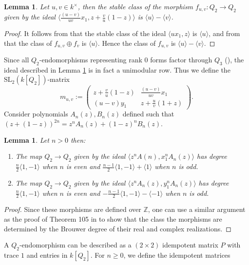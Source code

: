 \documentclass[11pt,leqno]{article}
\newcommand{\Z}{{\mathbb Z}}
\renewcommand{\1}{{\rm 1\hspace*{-0.4ex}%
\rule{0.1ex}{1.52ex}\hspace*{0.2ex}}}
\newcommand{\<}[1]{{\langle}#1 {\rangle}}
\theoremstyle{plain}
\newtheorem{lem}[thm]{Lemma}
\theoremstyle{definition}
\theoremstyle{remark}
\numberwithin{equation}{section}
\begin{document}
\begin{lem} 
\label{lem:q2rank0maps}
    Let $u,v \in k^\times$, then the stable class of the morphism $f_{u,v}\colon Q_2 \to Q_2 $ given by the ideal $\langle \frac{(u-v)}{uv}x_1,  z + \frac{v}{u}(1-z)\rangle$ is $\langle u\rangle - \langle v\rangle$. 
\end{lem}
\begin{proof}
     It follows from \cite[Proposition 103]{Barth25} that the stable class of the ideal $\langle ux_1,  z\rangle$ is $\langle u\rangle$, and from \cite[Lemma 91]{Barth25} that the class of $f_{u,v} \oplus f_v$ is $\langle u\rangle$. Hence the class of $f_{u,v}$ is $\langle u\rangle - \langle v\rangle $. 
\end{proof}
Since all $Q_2$-endomorphisms representing rank $0$ forms factor through $Q_3$ (\cite[Corollary 43]{Barth25}), the ideal described in Lemma \ref{lem:q2rank0maps} is in fact a unimodular row. Thus we define the $\mathrm{SL_2}(k[Q_2])$-matrix \[m_{u,v} := \begin{pmatrix}
    z + \frac{v}{u}(1-z) &  \frac{(u-v)}{uv}x_1 \\ (u-v)y_1  & z + \frac{u}{v}(1+z) 
\end{pmatrix}.\]
Consider polynomials $A_n(z), B_n(z)$ defined such that $(z + (1-z))^{2n} = z^n A_n(z) + (1-z)^n B_n(z)$. 
\begin{lem}
\label{lem:Q2hyperbolic}
    Let $n>0$ then: 
    \begin{enumerate}
        \item The map $Q_2 \to Q_2$ given by the ideal $\langle z^n A(n), x_1^nA_n(z)\rangle$ has degree 
    $\frac{n}{2}\langle 1,-1\rangle$ when $n$ is even and  $\frac{n-1}{2}\langle 1,-1\rangle + \langle1\rangle$ when $n$ is odd. 
    
    \item The map $Q_2 \to Q_2$ given by the ideal $\langle z^n A_n(z), y_1^nA_n(z)\rangle$ has degree 
    $\frac{n}{2}\langle 1,-1\rangle$ when $n$ is even and  $-\frac{n-1}{2}\langle 1,-1\rangle - \langle -1\rangle$ when $n$ is odd.
    \end{enumerate}
\end{lem}
\begin{proof}
    Since these morphisms are defined over $\Z$, one can use a similar argument as the proof of Theorem 105 in \cite{Barth25} to show that the class the morphisms are determined by the Brouwer degree of their real and complex realizations. 
\end{proof}
 A $Q_2$-endomorphism can be described as a $(2 \times 2)$ idempotent matrix $P$ with trace $1$ and entries in $k[Q_2]$. For $n \geq 0$, we define the idempotent matrices
\end{document}
